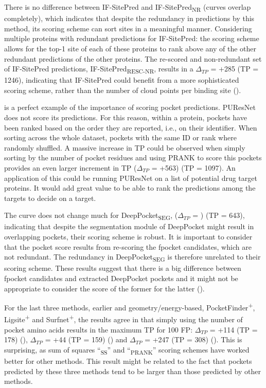 There is no difference between IF-SitePred and IF-SitePred\textsubscript{NR} (curves overlap completely), which indicates that despite the redundancy in predictions by this method, its scoring scheme can sort sites in a meaningful manner. Considering multiple proteins with redundant predictions for IF-SitePred: the scoring scheme allows for the top-1 site of each of these proteins to rank above any of the other redundant predictions of the other proteins. The re-scored and non-redundant set of IF-SitePred predictions, IF-SitePred\textsubscript{RESC-NR}, results in a $\Delta_{TP}$ = +285 (TP = 1246), indicating that IF-SitePred could benefit from a more sophisticated scoring scheme, rather than the number of cloud points per binding site ().

 is a perfect example of the importance of scoring pocket predictions. PUResNet does not score its predictions. For this reason, within a protein, pockets have been ranked based on the order they are reported, i.e., on their identifier. When sorting across the whole dataset, pockets with the same ID or rank where randomly shuffled. A massive increase in TP could be observed when simply sorting by the number of pocket residues and using PRANK to score this pockets provides an even larger increment in TP ($\Delta_{TP}$ = +563) (TP = 1097). An application of this could be running PUResNet on a list of potential drug target proteins. It would add great value to be able to rank the predictions among the targets to decide on a target.

The curve does not change much for DeepPocket\textsubscript{SEG}, ($\Delta_{TP}$ = ) (TP = 643), indicating that despite the segmentation module of DeepPocket might result in overlapping pockets, their scoring scheme is robust. It is important to consider that the pocket score results from re-scoring the fpocket candidates, which are not redundant. The redundancy in DeepPocket\textsubscript{SEG} is therefore unrelated to their scoring scheme. These results suggest that there is a big difference between fpocket candidates and extracted DeepPocket pockets and it might not be appropriate to consider the score of the former for the latter ().

For the last three methods, earlier and geometry/energy-based, PocketFinder\textsuperscript{+}, Ligsite\textsuperscript{+} and Surfnet\textsuperscript{+}, the results agree in that simply using the number of pocket amino acids results in the maximum TP for 100 FP: $\Delta_{TP}$ = +114 (TP = 178) (), $\Delta_{TP}$ = +44 (TP = 159) () and $\Delta_{TP}$ = +247 (TP = 308) (). This is surprising, as sum of squares ``\textsubscript{SS}'' and ``\textsubscript{PRANK}'' scoring schemes have worked better for other methods. This result might be related to the fact that pockets predicted by these three methods tend to be larger than those predicted by other methods.

